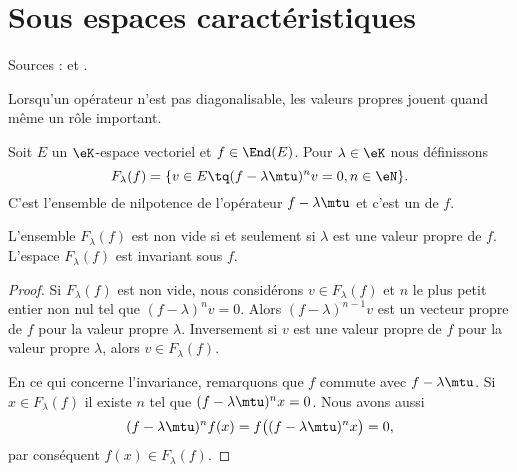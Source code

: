 \section{Sous espaces caractéristiques}


Sources : \cite{MneimneReduct} et .

Lorsqu'un opérateur n'est pas diagonalisable, les valeurs propres jouent quand même un rôle important.

Soit \( E\) un \( \eK\)-espace vectoriel et \( f\in\End(E)\). Pour \( \lambda\in \eK\) nous définissons
\begin{equation}
    F_{\lambda}(f)=\{ v\in E\tq (f-\lambda\mtu)^nv=0, n\in\eN \}.
\end{equation}
C'est l'ensemble de nilpotence de l'opérateur \( f-\lambda\mtu\) et c'est un  de \( f\).

\begin{lemma}
    L'ensemble \( F_{\lambda}(f)\) est non vide si et seulement si \( \lambda\) est une valeur propre de \( f\). L'espace \( F_{\lambda}(f)\) est invariant sous \( f\).
\end{lemma}

\begin{proof}
    Si \( F_{\lambda}(f)\) est non vide, nous considérons \( v\in F_{\lambda}(f)\) et \( n\) le plus petit entier non nul tel que \( (f-\lambda)^nv=0\). Alors \( (f-\lambda)^{n-1}v\) est un vecteur propre de \( f\) pour la valeur propre \( \lambda\). Inversement si \( v\) est une valeur propre de \( f\) pour la valeur propre \( \lambda\), alors \( v\in F_{\lambda}(f)\).

    En ce qui concerne l'invariance, remarquons que \( f\) commute avec \( f-\lambda\mtu\). Si \( x\in F_{\lambda}(f)\) il existe \( n\) tel que \( (f-\lambda\mtu)^nx=0\). Nous avons aussi
    \begin{equation}
        (f-\lambda\mtu)^nf(x)=f\big( (f-\lambda\mtu)^nx \big)=0,
    \end{equation}
    par conséquent \( f(x)\in F_{\lambda}(f)\).
\end{proof}

